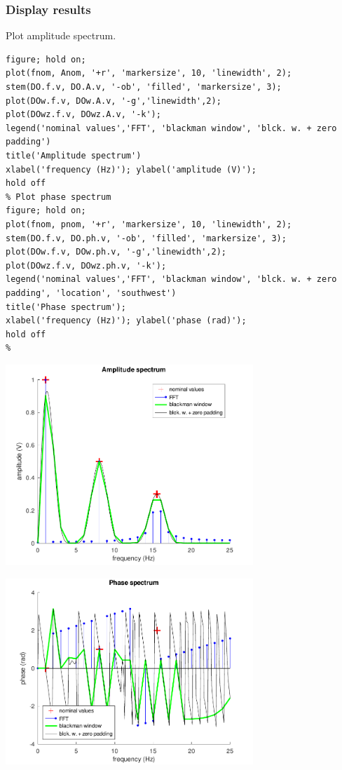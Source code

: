 {}
\subsubsection*{Display results}



Plot amplitude spectrum.

\begin{lstlisting}
figure; hold on;
plot(fnom, Anom, '+r', 'markersize', 10, 'linewidth', 2);
stem(DO.f.v, DO.A.v, '-ob', 'filled', 'markersize', 3);
plot(DOw.f.v, DOw.A.v, '-g','linewidth',2);
plot(DOwz.f.v, DOwz.A.v, '-k');
legend('nominal values','FFT', 'blackman window', 'blck. w. + zero padding')
title('Amplitude spectrum')
xlabel('frequency (Hz)'); ylabel('amplitude (V)');
hold off
% Plot phase spectrum
figure; hold on;
plot(fnom, pnom, '+r', 'markersize', 10, 'linewidth', 2);
stem(DO.f.v, DO.ph.v, '-ob', 'filled', 'markersize', 3);
plot(DOw.f.v, DOw.ph.v, '-g','linewidth',2);
plot(DOwz.f.v, DOwz.ph.v, '-k');
legend('nominal values','FFT', 'blackman window', 'blck. w. + zero padding', 'location', 'southwest')
title('Phase spectrum');
xlabel('frequency (Hz)'); ylabel('phase (rad)');
hold off
%
\end{lstlisting}
\begin{center}
\includegraphics[width=0.7\textwidth]{algs_examples_published/SP-WFFT_alg_example-1.pdf}
\end{center}
\begin{center}
\includegraphics[width=0.7\textwidth]{algs_examples_published/SP-WFFT_alg_example-2.pdf}
\end{center}


